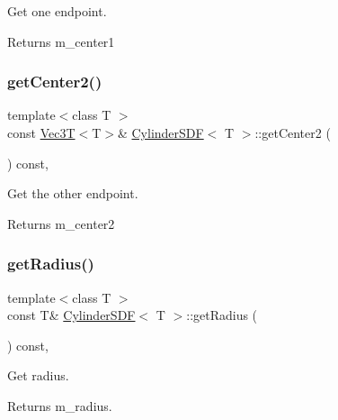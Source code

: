 Get one endpoint. 

\begin{DoxyReturn}{Returns}
m\+\_\+center1 
\end{DoxyReturn}
\mbox{\label{classCylinderSDF_aa4188d330f841f04a3f7dba6d1ef9c8f}} 
\subsubsection{\texorpdfstring{get\+Center2()}{getCenter2()}}
{\footnotesize\ttfamily template$<$class T $>$ \\
const \hyperlink{classVec3T}{Vec3T}$<$T$>$\& \hyperlink{classCylinderSDF}{Cylinder\+S\+DF}$<$ T $>$\+::get\+Center2 (\begin{DoxyParamCaption}{ }\end{DoxyParamCaption}) const\hspace{0.3cm}{\ttfamily [inline]}, {\ttfamily [noexcept]}}



Get the other endpoint. 

\begin{DoxyReturn}{Returns}
m\+\_\+center2 
\end{DoxyReturn}
\mbox{\label{classCylinderSDF_a545624c47a5a898b74059e95d44461b2}} 
\subsubsection{\texorpdfstring{get\+Radius()}{getRadius()}}
{\footnotesize\ttfamily template$<$class T $>$ \\
const T\& \hyperlink{classCylinderSDF}{Cylinder\+S\+DF}$<$ T $>$\+::get\+Radius (\begin{DoxyParamCaption}{ }\end{DoxyParamCaption}) const\hspace{0.3cm}{\ttfamily [inline]}, {\ttfamily [noexcept]}}



Get radius. 

\begin{DoxyReturn}{Returns}
m\+\_\+radius. 
\end{DoxyReturn}
\mbox{\label{classCylinderSDF_a082c08089b07402d55020ed8186cc992}} 
